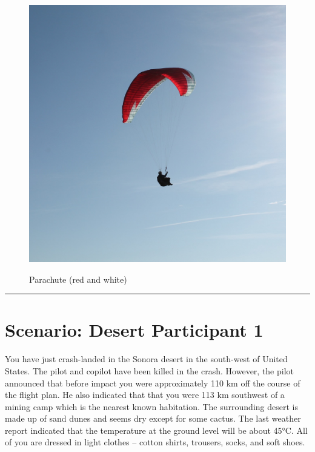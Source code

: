 \documentclass{article}
\begin{document}
    \begin{figure}[H]
        \centering
        \begin{minipage}{0.25\textwidth}
            \centering
            \includegraphics[width=\textwidth]{../SurvivalItemImages/parachute}
        \end{minipage}\hfill
        \begin{minipage}{0.7\textwidth}
            \centering
            \Large Parachute (red and white)
        \end{minipage}
    \end{figure}
    \vspace{-0.8em}
    \noindent\rule{\textwidth}{0.4pt}
            
    \clearpage
    \section*{Scenario: \textmd{Desert} \hfill Participant \textmd{1}}
    \Large You have just crash-landed in the Sonora desert in the south-west of United States. The pilot and copilot have been killed in the crash. However, the pilot announced that before impact you were approximately 110 km off the course of the flight plan. He also indicated that that you were 113 km southwest of a mining camp which is the nearest known habitation. The surrounding desert is made up of sand dunes and seems dry except for some cactus. The last weather report indicated that the temperature at the ground level will be about 45°C. All of you are dressed in light clothes – cotton shirts, trousers, socks, and soft shoes. 
\end{document}
